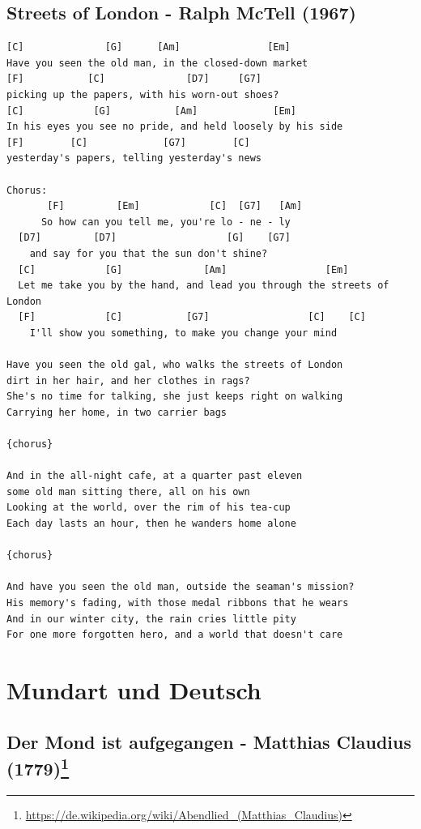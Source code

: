 \documentclass[
]{book}
\let\stdsection\section
\renewcommand\section{\clearpage\stdsection}
\begin{document}
\hypertarget{classics-streets-of-london}{%
\section{Streets of London - Ralph McTell (1967)}\label{classics-streets-of-london}}

\begin{verbatim}
[C]              [G]      [Am]               [Em]
Have you seen the old man, in the closed-down market
[F]           [C]              [D7]     [G7]
picking up the papers, with his worn-out shoes?
[C]            [G]           [Am]             [Em]
In his eyes you see no pride, and held loosely by his side
[F]        [C]             [G7]        [C]
yesterday's papers, telling yesterday's news

Chorus:
       [F]         [Em]            [C]  [G7]   [Am]
      So how can you tell me, you're lo - ne - ly
  [D7]         [D7]                   [G]    [G7]
    and say for you that the sun don't shine?
  [C]            [G]              [Am]                 [Em]
  Let me take you by the hand, and lead you through the streets of London
  [F]            [C]           [G7]                 [C]    [C]
    I'll show you something, to make you change your mind

Have you seen the old gal, who walks the streets of London
dirt in her hair, and her clothes in rags?
She's no time for talking, she just keeps right on walking
Carrying her home, in two carrier bags

{chorus}

And in the all-night cafe, at a quarter past eleven
some old man sitting there, all on his own
Looking at the world, over the rim of his tea-cup
Each day lasts an hour, then he wanders home alone

{chorus}

And have you seen the old man, outside the seaman's mission?
His memory's fading, with those medal ribbons that he wears
And in our winter city, the rain cries little pity
For one more forgotten hero, and a world that doesn't care

\end{verbatim}

\hypertarget{mundart-und-deutsch}{%
\chapter{Mundart und Deutsch}\label{mundart-und-deutsch}}

\hypertarget{mundart-und-deutsch-der-mond}{%
\section[Der Mond ist aufgegangen - Matthias Claudius (1779)]{\texorpdfstring{Der Mond ist aufgegangen - Matthias Claudius (1779)\footnote{\url{https://de.wikipedia.org/wiki/Abendlied_(Matthias_Claudius)}}}{Der Mond ist aufgegangen - Matthias Claudius (1779)}}\label{mundart-und-deutsch-der-mond}}
\end{document}
